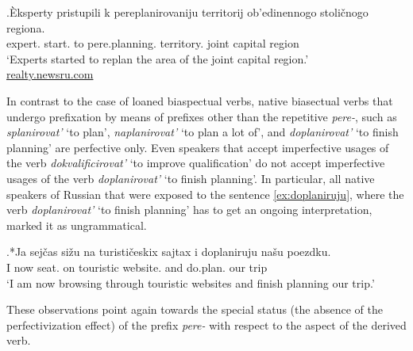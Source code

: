 \exg.\label{ex:pereplanirovanie}\`{E}ksperty pristupili k pereplanirovaniju territorij ob'edinennogo stoli\v{c}nogo regiona.\\
expert. start. to pere.planning. territory. joint capital region\\
\trans `Experts started to replan the area of the joint capital region.'\\\hbox{}\hfill\hbox{\url{realty.newsru.com}}

In contrast to the case of loaned biaspectual verbs, native biasectual verbs that undergo prefixation by means of prefixes other than the repetitive \textit{pere-}, such as \textit{splanirovat'} `to plan', \textit{naplanirovat'} `to plan a lot of', and \textit{doplanirovat'} `to finish planning' are perfective only. Even speakers that accept imperfective usages of the verb \textit{dokvalificirovat'} `to improve qualification' do not accept imperfective usages of the verb \textit{doplanirovat'} `to finish planning'. In particular, all native speakers of Russian that were exposed to the sentence \ref{ex:doplaniruju}, where the verb \textit{doplanirovat'} `to finish planning' has to get an ongoing interpretation, marked it as ungrammatical.

\exg.*Ja sej\v{c}as si\v{z}u na turisti\v{c}eskix sajtax i doplaniruju na\v{s}u poezdku.\label{ex:doplaniruju}\\
I now seat. on touristic website. and do.plan. our trip\\
\trans `I am now browsing through touristic websites and finish planning our trip.'\largerpage

These observations point again towards the special status (the absence of the perfectivization effect) of the prefix \textit{pere-} with respect to the aspect of the derived verb.

